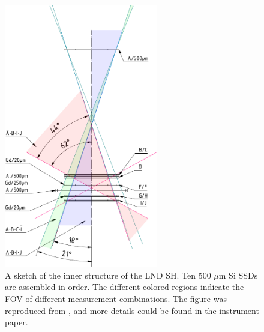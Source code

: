 \begin{figure}[!htb]
    \centering
    \includegraphics[width = 0.6\textwidth, height = 0.5 \textheight]{images/change4_lnd-c9_trigger-cones-colored.pdf}
    \caption[The inner structure of LND \ac{SH}]{A sketch of the inner structure of the \ac{LND} \ac{SH}. Ten 500 $\mu$m Si \acp{SSD} are assembled in order. The different colored regions indicate the \ac{FOV} of different measurement combinations. The figure was reproduced from \citet{Wimmer2020SSRv}, and more details could be found in the instrument paper.}
    \label{Fig:LND_sensor_head}
\end{figure}
